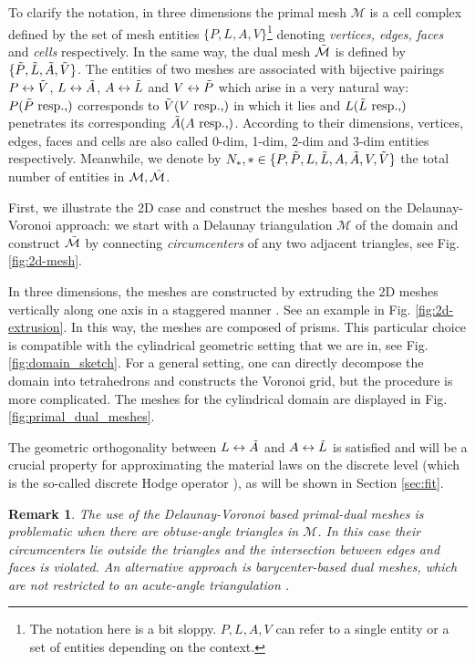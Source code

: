 \documentclass{article}
\newtheorem*{remark}{Remark}
\begin{document}
To clarify the notation, in three dimensions the primal mesh $\mathcal{M}$ is a cell complex defined by the set of mesh entities $\{P, L, A, V\}$\footnote{The notation here is a bit sloppy. $P, L, A, V$ can refer to a single entity or a set of entities depending on the context.} denoting \emph{vertices, edges, faces} and \emph{cells} respectively. In the same way, the dual mesh $\Tilde{\mathcal{M}}$ is defined by $\{\Tilde{P}, \Tilde{L}, \Tilde{A}, \Tilde{V}\}$. The entities of two meshes are associated with bijective pairings $P \leftrightarrow \Tilde{V}$, $L \leftrightarrow \Tilde{A}$, $A \leftrightarrow \Tilde{L}$ and $V \leftrightarrow \Tilde{P}$ which arise in a very natural way: $P(\Tilde{P} \text{ resp.,})$ corresponds to $\Tilde{V}(V \text{ resp.,})$ in which it lies and $L(\Tilde{L} \text{ resp.,})$ penetrates its corresponding $\Tilde{A}(A \text{ resp.,})$. According to their dimensions, vertices, edges, faces and cells are also called 0-dim, 1-dim, 2-dim and 3-dim entities respectively. Meanwhile, we denote by $N_\ast, \ast \in \{P, \Tilde{P}, L, \Tilde{L},A, \Tilde{A},V, \Tilde{V}\}$ the total number of entities in $\mathcal{M}, \Tilde{\mathcal{M}}$. 

First, we illustrate the 2D case and construct the meshes based on the Delaunay-Voronoi approach: we start with a Delaunay triangulation $\mathcal{M}$ of the domain and construct $\Tilde{\mathcal{M}}$ by connecting \emph{circumcenters} of any two adjacent triangles, see Fig. \ref{fig:2d-mesh}.

In three dimensions, the meshes are constructed by extruding the 2D meshes vertically along one axis in a staggered manner \cite[][Sec. 3.1]{Marrone_2001}. See an example in Fig. \ref{fig:2d-extrusion}. In this way, the meshes are composed of prisms. This particular choice is compatible with the cylindrical geometric setting that we are in, see Fig. \ref{fig:domain_sketch}. For a general setting, one can directly decompose the domain into tetrahedrons and constructs the Voronoi grid, but the procedure is more complicated. The meshes for the cylindrical domain are displayed in Fig. \ref{fig:primal_dual_meshes}. 

The geometric orthogonality between $L \leftrightarrow \Tilde{A}$ and $A \leftrightarrow \Tilde{L}$ is satisfied and will be a crucial property for approximating the material laws on the discrete level (which is the so-called discrete Hodge operator \cite{hip_1999, bossavit1999}), as will be shown in Section \ref{sec:fit}. 

\begin{remark}
    The use of the Delaunay-Voronoi based primal-dual meshes is problematic when there are obtuse-angle triangles in $\mathcal{M}$. In this case their circumcenters lie outside the triangles and the intersection between edges and faces is violated. An alternative approach is barycenter-based dual meshes, which are not restricted to an acute-angle triangulation \cite[][Sec. 4.2]{Marrone_2001}. 
\end{remark}
\end{document}
